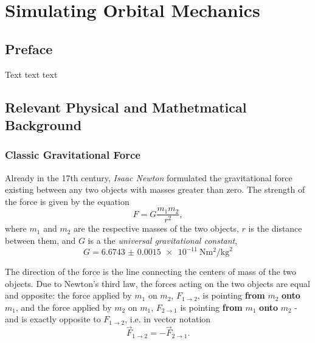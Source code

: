 \chapter{Simulating Orbital Mechanics}
\section{Preface}
Text text text

\section{Relevant Physical and Mathetmatical Background}
\subsection{Classic Gravitational Force}
Already in the 17th century, \textit{Isaac Newton} formulated the gravitational force existing between any two objects with masses greater than zero. The strength of the force is given by the equation
\begin{equation}
    F = G\frac{m_{1}m_{2}}{r^{2}},
    \label{eq:force_gravity}
\end{equation}
where $m_{1}$ and $m_{2}$ are the respective masses of the two objects, $r$ is the distance between them, and $G$ is a the \textit{universal gravitational constant},
\begin{equation}
    G = \SI{6.6743(15)e-11}{\newton\metre\squared\per\kg\squared}
    \label{eq:universal_gravity_constant}
\end{equation}

The direction of the force is the line connecting the centers of mass of the two objects. Due to Newton's third law, the forces acting on the two objects are equal and opposite: the force applied by $m_{1}$ on $m_{2}$, $F_{1\to2}$, is pointing \textbf{from} $m_{2}$ \textbf{onto} $m_{1}$, and the force applied by $m_{2}$ on $m_{1}$, $F_{2\to1}$ is pointing \textbf{from} $m_{1}$ \textbf{onto} $m_{2}$ - and is exactly opposite to $F_{1\to2}$, i.e. in vector notation
\begin{equation}
    \vec{F}_{1\to2} = -\vec{F}_{2\to1}.
    \label{eq:gravity_force_vector_directions}
\end{equation}

